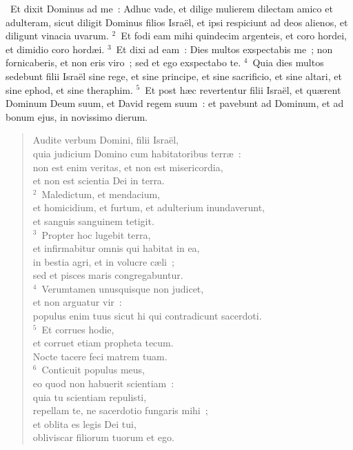 ~Et dixit Dominus ad me~: Adhuc vade, et dilige mulierem dilectam amico et adulteram, sicut diligit Dominus filios Isra\"el, et ipsi respiciunt ad deos alienos, et diligunt vinacia uvarum.
${}^{2}$~Et fodi eam mihi quindecim argenteis, et coro hordei, et dimidio coro hord\ae i.
${}^{3}$~Et dixi ad eam~: Dies multos exspectabis me~; non fornicaberis, et non eris viro~; sed et ego exspectabo te.
${}^{4}$~Quia dies multos sedebunt filii Isra\"el sine rege, et sine principe, et sine sacrificio, et sine altari, et sine ephod, et sine theraphim.
${}^{5}$~Et post h\ae c revertentur filii Isra\"el, et qu\ae rent Dominum Deum suum, et David regem suum~: et pavebunt ad Dominum, et ad bonum ejus, in novissimo dierum.
\begin{flushleft}\begin{verse}\vspace{-19pt}Audite verbum Domini, filii Isra\"el,\\ quia judicium Domino cum habitatoribus terr\ae~:\\ non est enim veritas, et non est misericordia,\\ et non est scientia Dei in terra.\\
${}^{2}$~Maledictum, et mendacium,\\ et homicidium, et furtum, et adulterium inundaverunt,\\ et sanguis sanguinem tetigit.\\
${}^{3}$~Propter hoc lugebit terra,\\ et infirmabitur omnis qui habitat in ea,\\ in bestia agri, et in volucre c\ae li~;\\ sed et pisces maris congregabuntur.\\
${}^{4}$~Verumtamen unusquisque non judicet,\\ et non arguatur vir~:\\ populus enim tuus sicut hi qui contradicunt sacerdoti.\\
${}^{5}$~Et corrues hodie,\\ et corruet etiam propheta tecum.\\ Nocte tacere feci matrem tuam.\\
${}^{6}$~Conticuit populus meus,\\ eo quod non habuerit scientiam~:\\ quia tu scientiam repulisti,\\ repellam te, ne sacerdotio fungaris mihi~;\\ et oblita es legis Dei tui,\\ obliviscar filiorum tuorum et ego.\\

\end{verse}
\end{flushleft}
